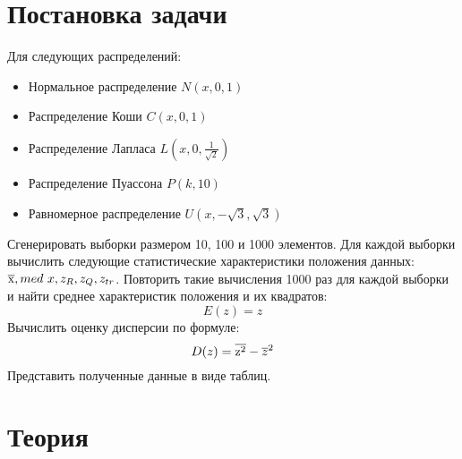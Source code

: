 \documentclass[12pt,a4paper]{article}
\begin{document}
	\section{Постановка задачи}
	Для следующих распределений:
	\begin{itemize}
		\item Нормальное распределение $\textit{N}(\textit{x}, 0, 1)$
		\item Распределение Коши $\textit{C}(\textit{x}, 0, 1)$
		\item Распределение Лапласа $\textit{L}(\textit{x}, 0, \frac{1}{\sqrt{2}})$
		\item Распределение Пуассона $\textit{P}(\textit{k}, 10)$
		\item Равномерное распределение $\textit{U}(\textit{x}, -\sqrt{3}, \sqrt{3})$
	\end{itemize}
	Сгенерировать выборки размером 10, 100 и 1000 элементов.
	Для каждой выборки вычислить следующие статистические характеристики положения данных: $\overline{\rm x}, med \ x, z_R, z_Q, z_{tr}$. Повторить такие
	вычисления 1000 раз для каждой выборки и найти среднее характеристик положения и их квадратов:
	\begin{equation}\label{E(z)}
		E(z)=z
	\end{equation}
	Вычислить оценку дисперсии по формуле:
	\begin{equation}
		D(z)=\overline{\rm z^2}-\overline{z}^2\label{D(Z)}
	\end{equation}
	Представить полученные данные в виде таблиц.
	
	\newpage
	
	\section{Теория}
\end{document}
